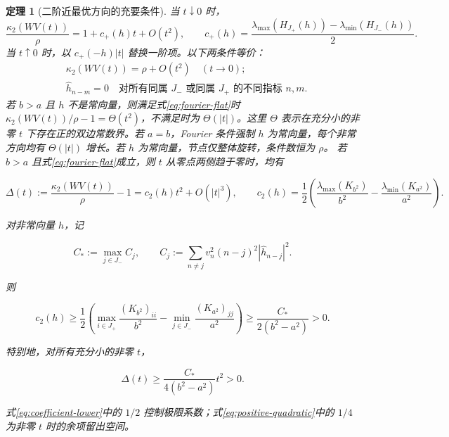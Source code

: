 \documentclass[UTF8,a4paper,zihao=-4,fontset=windows]{ctexart}
\theoremstyle{chinese}
\newtheorem{theorem}{定理}[section]
\numberwithin{equation}{section}
\newcommand{\cond}{\kappa_2}
\begin{document}
\begin{theorem}[二阶近最优方向的充要条件]\label{thm:directional}
当 $t\downarrow0$ 时，
\begin{equation}\label{eq:directional-slope}
\frac{\cond(WV(t))}{\rho}
=1+c_+(h)t+O(t^2),\qquad
c_+(h)=\frac{\lambda_{\max}(H_{J_+}(h))-\lambda_{\min}(H_{J_-}(h))}{2}.
\end{equation}
当 $t\uparrow0$ 时，以 $c_+(-h)|t|$ 替换一阶项。以下两条件等价：
\begin{align}
&\cond(WV(t))=\rho+O(t^2)\quad(t\to0);\label{eq:quadratic-flat}\\
&\widehat h_{n-m}=0\quad\text{对所有同属 $J_-$ 或同属 $J_+$ 的不同指标 $n,m$}.\label{eq:fourier-flat}
\end{align}
若 $b>a$ 且 $h$ 不是常向量，则满足式\eqref{eq:fourier-flat}时
$\cond(WV(t))/\rho-1=\Theta(t^2)$，不满足时为 $\Theta(|t|)$。这里 $\Theta$ 表示在充分小的非零 $t$ 下存在正的双边常数界。若 $a=b$，Fourier 条件强制 $h$ 为常向量，每个非常方向均有 $\Theta(|t|)$ 增长。若 $h$ 为常向量，节点仅整体旋转，条件数恒为 $\rho$。
若 $b>a$ 且式\eqref{eq:fourier-flat}成立，则 $t$ 从零点两侧趋于零时，均有

\begin{equation}\label{eq:general-second}
\Delta(t):=\frac{\cond(WV(t))}{\rho}-1=c_2(h)t^2+O(|t|^3),\qquad
c_2(h)=\frac12\left(\frac{\lambda_{\max}(K_{b^2})}{b^2}
-\frac{\lambda_{\min}(K_{a^2})}{a^2}\right).
\end{equation}

对非常向量 $h$，记

\[
C_*:=\max_{j\in J_-}C_j,\qquad
C_j:=\sum_{n\ne j}v_n^2(n-j)^2|\widehat h_{n-j}|^2.
\]

则

\begin{equation}\label{eq:coefficient-lower}
c_2(h)\ge\frac12\left(
\max_{i\in J_+}\frac{(K_{b^2})_{ii}}{b^2}
-\min_{j\in J_-}\frac{(K_{a^2})_{jj}}{a^2}\right)
\ge\frac{C_*}{2(b^2-a^2)}>0.
\end{equation}

特别地，对所有充分小的非零 $t$，

\begin{equation}\label{eq:positive-quadratic}
\Delta(t)\ge\frac{C_*}{4(b^2-a^2)}t^2>0.
\end{equation}

式\eqref{eq:coefficient-lower}中的 $1/2$ 控制极限系数；式\eqref{eq:positive-quadratic}中的 $1/4$ 为非零 $t$ 时的余项留出空间。
\end{theorem}
\end{document}
